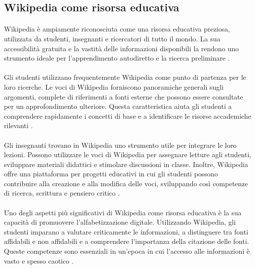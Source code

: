 \documentclass[12pt,a4paper]{report}
\begin{document}
\subsection{Wikipedia come risorsa educativa}

\paragraph*{}
Wikipedia è ampiamente riconosciuta come una risorsa educativa preziosa, utilizzata da studenti, insegnanti e ricercatori di tutto il mondo. La sua accessibilità gratuita e la vastità delle informazioni disponibili la rendono uno strumento ideale per l'apprendimento autodiretto e la ricerca preliminare \cite{reagle2010good}.

\paragraph*{}
Gli studenti utilizzano frequentemente Wikipedia come punto di partenza per le loro ricerche. Le voci di Wikipedia forniscono panoramiche generali sugli argomenti, complete di riferimenti a fonti esterne che possono essere consultate per un approfondimento ulteriore. Questa caratteristica aiuta gli studenti a comprendere rapidamente i concetti di base e a identificare le risorse accademiche rilevanti \cite{denning2005wikipedia}.

\paragraph*{}
Gli insegnanti trovano in Wikipedia uno strumento utile per integrare le loro lezioni. Possono utilizzare le voci di Wikipedia per assegnare letture agli studenti, sviluppare materiali didattici e stimolare discussioni in classe. Inoltre, Wikipedia offre una piattaforma per progetti educativi in cui gli studenti possono contribuire alla creazione e alla modifica delle voci, sviluppando così competenze di ricerca, scrittura e pensiero critico \cite{jemielniak2014wikipedia}.

\paragraph*{}
Uno degli aspetti più significativi di Wikipedia come risorsa educativa è la sua capacità di promuovere l'alfabetizzazione digitale. Utilizzando Wikipedia, gli studenti imparano a valutare criticamente le informazioni, a distinguere tra fonti affidabili e non affidabili e a comprendere l'importanza della citazione delle fonti. Queste competenze sono essenziali in un'epoca in cui l'accesso alle informazioni è vasto e spesso caotico \cite{lih2009wikipedia}.
\end{document}
